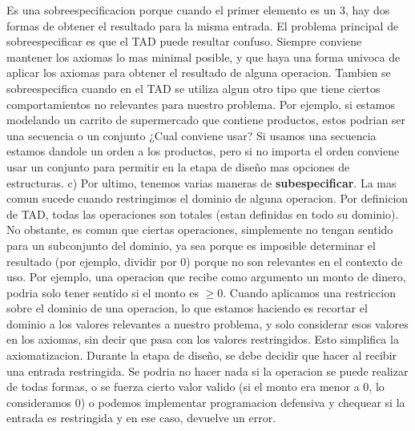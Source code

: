 \documentclass[10pt,a4paper]{article}
\begin{document}
\newline
Es una sobreespecificacion porque cuando el primer elemento es un 3, hay dos formas de obtener el resultado para la misma entrada.
\newline
\newline
El problema principal de sobreespecificar es que el TAD puede resultar confuso. Siempre conviene mantener los axiomas lo mas minimal posible, y que haya una forma univoca de aplicar los axiomas para obtener el resultado de alguna operacion.
\newline
\newline
Tambien se sobreespecifica cuando en el TAD se utiliza algun otro tipo que tiene ciertos comportamientos no relevantes para nuestro problema. Por ejemplo, si estamos modelando un carrito de supermercado que contiene productos, estos podrian ser una secuencia o un conjunto ¿Cual conviene usar? Si usamos una secuencia estamos dandole un orden a los productos, pero si no importa el orden conviene usar un conjunto para permitir en la etapa de diseño mas opciones de estructuras.   
\newline
\newline
c) Por ultimo, tenemos varias maneras de \textbf{subespecificar}. La mas comun sucede cuando restringimos el dominio de alguna operacion. Por definicion de TAD, todas las operaciones son totales (estan definidas en todo su dominio). No obstante, es comun que ciertas operaciones, simplemente no tengan sentido para un subconjunto del dominio, ya sea porque es imposible determinar el resultado (por ejemplo, dividir por 0) porque no son relevantes en el contexto de uso. Por ejemplo, una operacion que recibe como argumento un monto de dinero, podria solo tener sentido si el monto es $\geq 0$.    
\newline
\newline
Cuando aplicamos una restriccion sobre el dominio de una operacion, lo que estamos haciendo es recortar el dominio a los valores relevantes a nuestro problema, y solo considerar esos valores en los axiomas, sin decir que pasa con los valores restringidos. Esto simplifica la axiomatizacion. Durante la etapa de diseño, se debe decidir que hacer al recibir una entrada restringida. Se podria no hacer nada si la operacion se puede realizar de todas  formas, o se fuerza cierto valor valido (si el monto era menor a 0, lo consideramos 0) o podemos implementar programacion defensiva y chequear si la entrada es restringida y en ese caso, devuelve un error.      
\newline
\end{document}
